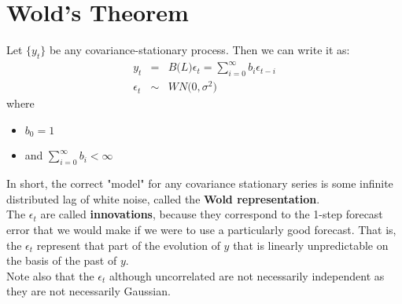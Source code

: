 \section{Wold's Theorem}
Let $\{y_{t}\}$ be any covariance-stationary process. Then we can write it as:
\begin{eqnarray}
	y_{t} &=& B\big(L\big)\epsilon_{t} = \sum_{i = 0}^{\infty}b_{i}\epsilon_{t - i}\\
	\epsilon_{t} &\sim& WN\Big(0, \sigma^{2}\Big) 
\end{eqnarray}
where
\begin{itemize}
	\item $b_{0} = 1$
	\item and $\sum_{i = 0}^{\infty}b_{i} < \infty$
\end{itemize}
In short, the correct "model" for any covariance stationary series is some infinite distributed lag of white noise, called the \textbf{\color{blue}Wold representation}.\\
The $\epsilon_{t}$ are called \textbf{\color{blue}innovations}, because they correspond to the 1-step forecast error that we would make if we were to use a particularly good forecast. That is, the $\epsilon_{t}$ represent that part of the evolution of $y$ that is linearly unpredictable on the basis of the past of $y$.\\
Note also that the $\epsilon_{t}$ although uncorrelated are not necessarily independent as they are not necessarily Gaussian.

